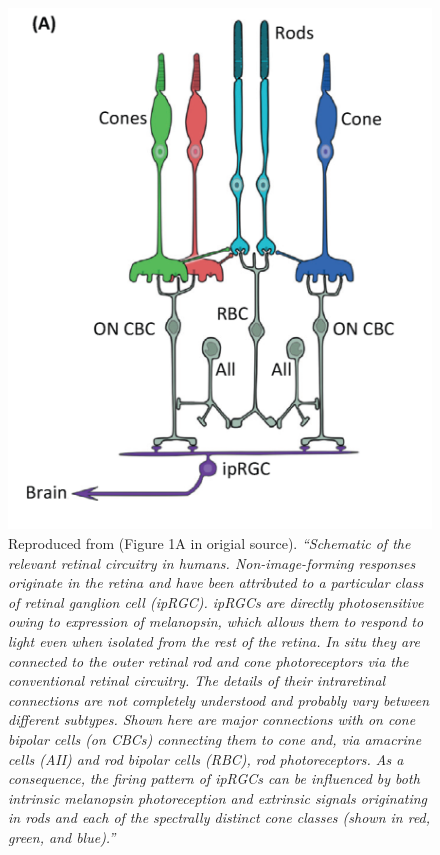 \begin{figure}[htbp]
\includegraphics[max width=\textwidth, center]{figs/LitRev/lucas.png}
\caption{Reproduced from \citet{lucas_measuring_2014} (Figure 1A in origial source). \textit{``Schematic of the relevant retinal circuitry in humans. Non-image-forming responses originate in the retina and have been attributed to a particular class of retinal ganglion cell (ipRGC). ipRGCs are directly photosensitive owing to expression of melanopsin, which allows them to respond to light even when isolated from the rest of the retina. In situ they are connected to the outer retinal rod and cone photoreceptors via the conventional retinal circuitry. The details of their intraretinal connections are not completely understood and probably vary between different subtypes. Shown here are major connections with on cone bipolar cells (on CBCs) connecting them to cone and, via amacrine cells (AII) and rod bipolar cells (RBC), rod photoreceptors. As a consequence, the firing pattern of ipRGCs can be influenced by both intrinsic melanopsin photoreception and extrinsic signals originating in rods and each of the spectrally distinct cone classes (shown in red, green, and blue).''}}
\label{fig:lucas}
\end{figure}

